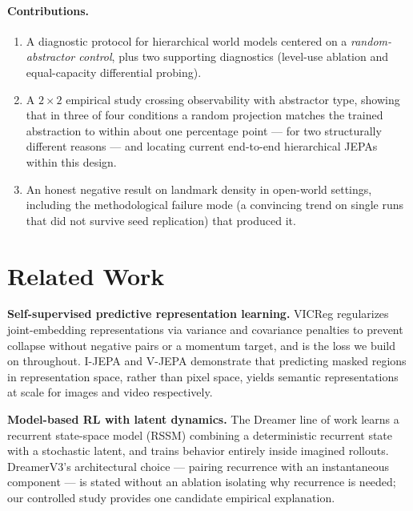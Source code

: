\documentclass[11pt]{article}
\begin{document}
\paragraph{Contributions.}
\begin{enumerate}
\item A diagnostic protocol for hierarchical world models centered on a \emph{random-abstractor control}, plus two supporting diagnostics (level-use ablation and equal-capacity differential probing).
\item A $2\times2$ empirical study crossing observability with abstractor type, showing that in three of four conditions a random projection matches the trained abstraction to within about one percentage point --- for two structurally different reasons --- and locating current end-to-end hierarchical JEPAs within this design.
\item An honest negative result on landmark density in open-world settings, including the methodological failure mode (a convincing trend on single runs that did not survive seed replication) that produced it.
\end{enumerate}

\section{Related Work}

\textbf{Self-supervised predictive representation learning.} VICReg \citep{bardes2021vicreg} regularizes joint-embedding representations via variance and covariance penalties to prevent collapse without negative pairs or a momentum target, and is the loss we build on throughout. I-JEPA \citep{assran2023ijepa} and V-JEPA \citep{bardes2024vjepa} demonstrate that predicting masked regions in representation space, rather than pixel space, yields semantic representations at scale for images and video respectively.

\textbf{Model-based RL with latent dynamics.} The Dreamer line of work \citep{hafner2023dreamerv3} learns a recurrent state-space model (RSSM) combining a deterministic recurrent state with a stochastic latent, and trains behavior entirely inside imagined rollouts. DreamerV3's architectural choice --- pairing recurrence with an instantaneous component --- is stated without an ablation isolating why recurrence is needed; our controlled study provides one candidate empirical explanation.
\end{document}
